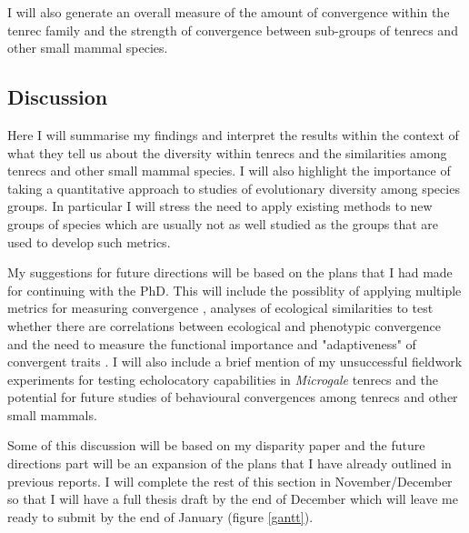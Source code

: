 \documentclass[12pt,a4paper]{article}
\begin{document}
	I will also generate an overall measure of the amount of convergence within the tenrec family and the strength of convergence between sub-groups of tenrecs and other small mammal species.
	
 
	

\subsection{Discussion}

	Here I will summarise my findings and interpret the results within the context of what they tell us about the diversity within tenrecs and the similarities among tenrecs and other small mammal species. I will also highlight the importance of taking a quantitative approach to studies of evolutionary diversity among species groups. In particular I will stress the need to apply existing methods to new groups of species which are usually not as well studied as the groups that are used to develop such metrics. %
	
	My suggestions for future directions will be based on the plans that I had made for continuing with the PhD. This will include the possiblity of applying multiple metrics for measuring convergence \citep[e.g.][]{Ingram2013, Segar2013, Harmon2005}, analyses of ecological similarities to test whether there are correlations between ecological and phenotypic convergence \citep[e.g.][]{Moen2013} and the need to measure the functional importance and "adaptiveness" of convergent traits \citep{Losos2010}. I will also include a brief mention of my unsuccessful fieldwork experiments for testing echolocatory capabilities in \textit{Microgale} tenrecs and the potential for future studies of behavioural convergences among tenrecs and other small mammals.


	
	Some of this discussion will be based on my disparity paper and the future directions part will be an expansion of the plans that I have already outlined in previous reports. I will complete the rest of this section in November/December so that I will have a full thesis draft by the end of December which will leave me ready to submit by the end of January (figure \ref{gantt}).




\end{document}
